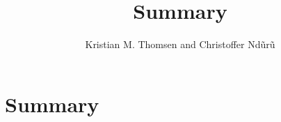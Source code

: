 \documentclass{article}
\begin{document}
\title{Summary}
\author{Kristian M. Thomsen and Christoffer Nd\~ur\~u}
\maketitle

\section{Summary}
\end{document}
